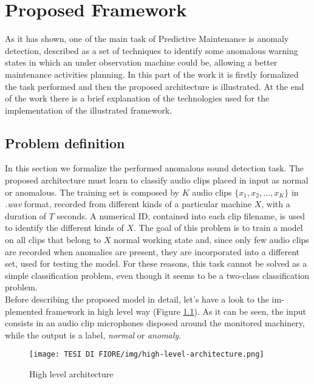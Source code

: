 \chapter{Proposed Framework}
As it has shown, one of the main task of Predictive Maintenance is anomaly detection, described as a set of techniques to identify some anomalous warning states in which an under observation machine could be, allowing a better maintenance activities planning. In this part of the work it is firstly formalized the task performed and then the proposed architecture is illustrated. At the end of the work there is a brief explanation of the technologies used for the implementation of the illustrated framework.
\section{Problem definition}
In this section we formalize the performed anomalous sound detection task. The proposed architecture must learn to classify audio clips placed in input as normal or anomalous. The training set is composed by $K$ audio clips $\{x_1, x_2, ...,x_K\}$ in \textit{.wav} format, recorded from different kinds of a particular machine $X$, with a duration of $T$ seconds. A numerical ID, contained into each clip filename, is used to identify the different kinds of $X$. The goal of this problem is to train a model on all clips that belong to $X$ normal working state and, since only few audio clips are recorded when anomalies are present, they are incorporated into a different set, used for testing the model. For these reasons, this task cannot be solved as a simple classification problem, even though it seems to be a two-class classification problem.\\
Before describing the proposed model in detail, let’s have a look to the im- plemented framework in high level way (Figure \ref{high-level-architecture}). As it can be seen, the input consists in an audio clip microphones disposed around the monitored machinery, while the output is a label, \textit{normal} or \textit{anomaly}.
\begin{figure}[ht]
\texttt{[image: TESI DI FIORE/img/high-level-architecture.png]}
\centering
\caption{High level architecture \cite{DCASE}}
\label{high-level-architecture}
\end{figure}

